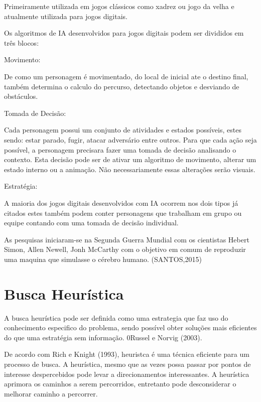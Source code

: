 Primeiramente utilizada em jogos clássicos como xadrez ou jogo da velha e atualmente utilizada para jogos digitais.


Os algoritmos de IA desenvolvidos para jogos digitais podem ser divididos em três blocos:

\begin{alineascomponto}
	
\item Movimento:

De como um personagem é movimentado, do local de inicial ate o destino final, também determina o calculo do percurso, detectando objetos e desviando de obstáculos.
   
 \item Tomada de Decisão:
 
Cada personagem possui um conjunto de atividades e estados possíveis, estes sendo: estar parado, fugir, atacar adversário entre outros. Para que cada ação seja possível, a personagem precisara fazer uma tomada de decisão analisando o contexto. Esta decisão pode ser de ativar um algoritmo de movimento, alterar um estado interno ou a animação. Não necessariamente essas alterações serão visuais.

\item Estratégia:

A maioria dos jogos digitais desenvolvidos com IA ocorrem nos dois tipos já citados estes também podem conter personagens que trabalham em grupo ou equipe contando com uma tomada de decisão individual.

	\end{alineascomponto}

	
As pesquisas iniciaram-se na Segunda Guerra Mundial com os cientistas Hebert Simon, Allen Newell,  Jonh McCarthy com o objetivo em comum de reproduzir uma maquina que simulasse o cérebro humano. (SANTOS,2015) 

\section{Busca Heurística}
\label{sec:Busca-Heurística}

A busca heurística pode ser definida como uma estrategia que faz uso do conhecimento especifico do problema, sendo possível obter soluções mais eficientes do que uma estratégia sem informação. 0Russel e Norvig (2003).

De acordo com Rich e Knight (1993), heuristca é uma técnica eficiente para um processo de busca. A heurística, mesmo que as vezes possa passar por pontos de interesse despercebidos pode levar a direcionamentos interessantes. A heurística aprimora os caminhos a serem percorridos, entretanto pode desconsiderar o melhorar caminho a percorrer. 

